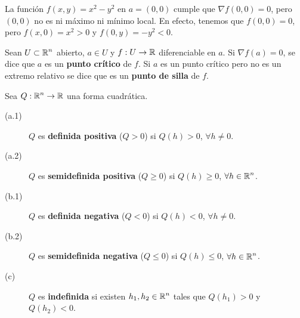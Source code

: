 \begin{eg}
La función $\displaystyle f\left(x,y\right) = x^{2}-y^{2} $ en $\displaystyle a = \left(0,0\right) $ cumple que $\displaystyle \nabla f\left(0,0\right) = 0 $, pero $\displaystyle \left(0,0\right) $ no es ni máximo ni mínimo local. En efecto, tenemos que $\displaystyle f\left(0,0\right) = 0 $, pero $\displaystyle f\left(x,0\right) = x^{2}>0 $ y $\displaystyle f\left(0,y\right) = -y^{2} < 0 $. 
\end{eg}
\begin{definition}
Sean $\displaystyle U\subset\mathbb{R}^{n} $ abierto, $\displaystyle a \in U $ y $\displaystyle f : U \to \mathbb{R} $ diferenciable en $\displaystyle a $. Si $\displaystyle \nabla f\left(a\right) = 0 $, se dice que $\displaystyle a $ es un \textbf{punto crítico} de $\displaystyle f $. Si $\displaystyle a $ es un punto crítico pero no es un extremo relativo se dice que es un \textbf{punto de silla} de $\displaystyle f $.
\end{definition}
\begin{definition}
Sea $\displaystyle Q : \mathbb{R}^{n} \to \mathbb{R} $ una forma cuadrática.
\begin{description}
\item[(a.1)] $\displaystyle Q $ es \textbf{definida positiva} ($\displaystyle Q > 0 $) si $\displaystyle Q\left(h\right) > 0 $, $\displaystyle \forall h \neq 0 $.
\item[(a.2)] $\displaystyle Q $ es \textbf{semidefinida positiva} ($\displaystyle Q \geq 0 $) si $\displaystyle Q\left(h\right) \geq 0 $, $\displaystyle \forall h \in \mathbb{R}^{n} $. 
\item[(b.1)] $\displaystyle Q $ es \textbf{definida negativa} ($\displaystyle Q < 0 $) si $\displaystyle Q\left(h\right) < 0 $, $\displaystyle \forall h \neq 0 $.
\item[(b.2)] $\displaystyle Q $ es \textbf{semidefinida negativa} ($\displaystyle Q \leq 0 $) si $\displaystyle Q\left(h\right) \leq 0 $, $\displaystyle \forall h \in \mathbb{R}^{n} $. 
\item[(c)] $\displaystyle Q $ es \textbf{indefinida} si existen $\displaystyle h_{1}, h_{2} \in \mathbb{R}^{n} $ tales que $\displaystyle Q\left(h_{1}\right) > 0 $ y $\displaystyle Q\left(h_{2}\right) < 0 $.
\end{description}
\end{definition}
